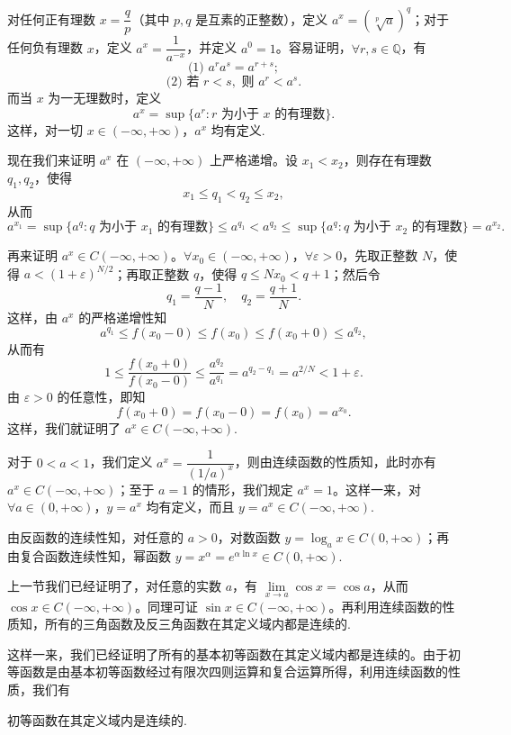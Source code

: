 对任何正有理数 $x=\dfrac qp$（其中 $p,q$ 是互素的正整数），定义 $a^x=(\sqrt[p]{a})^q$；对于任何负有理数 $x$，定义 $a^x=\dfrac1{a^{-x}}$，并定义 $a^0=1$。容易证明，$\forall r,s\in\mathbb Q$，有
\[
  \text{(1) } a^ra^s=a^{r+s};
\]
\[
  \text{(2) 若 } r<s,\text{ 则 } a^r<a^s.
\]
而当 $x$ 为一无理数时，定义
\[
  a^x=\sup\{a^r:r\text{ 为小于 }x\text{ 的有理数}\}.
\]
这样，对一切 $x\in(-\infty,+\infty)$，$a^x$ 均有定义.

现在我们来证明 $a^x$ 在 $(-\infty,+\infty)$ 上严格递增。设 $x_1<x_2$，则存在有理数 $q_1,q_2$，使得
\[
  x_1\leqslant q_1<q_2\leqslant x_2,
\]
从而
\[
  a^{x_1}=\sup\{a^q:q\text{ 为小于 }x_1\text{ 的有理数}\}
  \leqslant a^{q_1}<a^{q_2}
  \leqslant \sup\{a^q:q\text{ 为小于 }x_2\text{ 的有理数}\}=a^{x_2}.
\]

再来证明 $a^x\in C(-\infty,+\infty)$。$\forall x_0\in(-\infty,+\infty)$，$\forall\varepsilon>0$，先取正整数 $N$，使得 $a<(1+\varepsilon)^{N/2}$；再取正整数 $q$，使得 $q\leqslant Nx_0<q+1$；然后令
\[
  q_1=\frac{q-1}{N},\quad q_2=\frac{q+1}{N}.
\]
这样，由 $a^x$ 的严格递增性知
\[
  a^{q_1}\leqslant f(x_0-0)\leqslant f(x_0)\leqslant f(x_0+0)\leqslant a^{q_2},
\]
从而有
\[
  1\leqslant \frac{f(x_0+0)}{f(x_0-0)}
  \leqslant \frac{a^{q_2}}{a^{q_1}}
  =a^{q_2-q_1}=a^{2/N}<1+\varepsilon.
\]
由 $\varepsilon>0$ 的任意性，即知
\[
  f(x_0+0)=f(x_0-0)=f(x_0)=a^{x_0}.
\]
这样，我们就证明了 $a^x\in C(-\infty,+\infty)$.

对于 $0<a<1$，我们定义 $a^x=\dfrac1{(1/a)^x}$，则由连续函数的性质知，此时亦有 $a^x\in C(-\infty,+\infty)$；至于 $a=1$ 的情形，我们规定 $a^x=1$。这样一来，对 $\forall a\in(0,+\infty)$，$y=a^x$ 均有定义，而且 $y=a^x\in C(-\infty,+\infty)$.

由反函数的连续性知，对任意的 $a>0$，对数函数 $y=\log_a x\in C(0,+\infty)$；再由复合函数连续性知，幂函数 $y=x^\alpha=e^{\alpha\ln x}\in C(0,+\infty)$.

上一节我们已经证明了，对任意的实数 $a$，有 $\lim\limits_{x\to a}\cos x=\cos a$，从而 $\cos x\in C(-\infty,+\infty)$。同理可证 $\sin x\in C(-\infty,+\infty)$。再利用连续函数的性质知，所有的三角函数及反三角函数在其定义域内都是连续的.

这样一来，我们已经证明了所有的基本初等函数在其定义域内都是连续的。由于初等函数是由基本初等函数经过有限次四则运算和复合运算所得，利用连续函数的性质，我们有

\begin{theorem}\label{theorem:ma-3-2-3}
初等函数在其定义域内是连续的.
\end{theorem}


